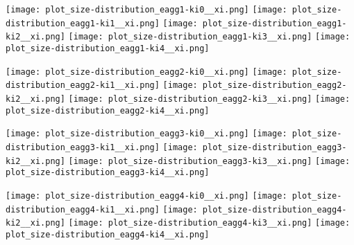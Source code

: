 \begin{minipage}{0.25\textwidth} 
 \texttt{[image: plot\_size-distribution\_eagg1-ki0\_\_xi.png]}
\texttt{[image: plot\_size-distribution\_eagg1-ki1\_\_xi.png]}
\texttt{[image: plot\_size-distribution\_eagg1-ki2\_\_xi.png]}
\texttt{[image: plot\_size-distribution\_eagg1-ki3\_\_xi.png]}
\texttt{[image: plot\_size-distribution\_eagg1-ki4\_\_xi.png]}
\end{minipage}%
\begin{minipage}{0.25\textwidth} 
 \texttt{[image: plot\_size-distribution\_eagg2-ki0\_\_xi.png]}
\texttt{[image: plot\_size-distribution\_eagg2-ki1\_\_xi.png]}
\texttt{[image: plot\_size-distribution\_eagg2-ki2\_\_xi.png]}
\texttt{[image: plot\_size-distribution\_eagg2-ki3\_\_xi.png]}
\texttt{[image: plot\_size-distribution\_eagg2-ki4\_\_xi.png]}
\end{minipage}%
\begin{minipage}{0.25\textwidth} 
 \texttt{[image: plot\_size-distribution\_eagg3-ki0\_\_xi.png]}
\texttt{[image: plot\_size-distribution\_eagg3-ki1\_\_xi.png]}
\texttt{[image: plot\_size-distribution\_eagg3-ki2\_\_xi.png]}
\texttt{[image: plot\_size-distribution\_eagg3-ki3\_\_xi.png]}
\texttt{[image: plot\_size-distribution\_eagg3-ki4\_\_xi.png]}
\end{minipage}%
\begin{minipage}{0.25\textwidth} 
 \texttt{[image: plot\_size-distribution\_eagg4-ki0\_\_xi.png]}
\texttt{[image: plot\_size-distribution\_eagg4-ki1\_\_xi.png]}
\texttt{[image: plot\_size-distribution\_eagg4-ki2\_\_xi.png]}
\texttt{[image: plot\_size-distribution\_eagg4-ki3\_\_xi.png]}
\texttt{[image: plot\_size-distribution\_eagg4-ki4\_\_xi.png]}
\end{minipage}%

